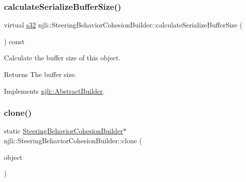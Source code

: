 \mbox{\label{classnjli_1_1_steering_behavior_cohesion_builder_ac9e90802685baa1d00dc45f5923e06e8}} 
\subsubsection{\texorpdfstring{calculate\+Serialize\+Buffer\+Size()}{calculateSerializeBufferSize()}}
{\footnotesize\ttfamily virtual \mbox{\hyperlink{_util_8h_aa62c75d314a0d1f37f79c4b73b2292e2}{s32}} njli\+::\+Steering\+Behavior\+Cohesion\+Builder\+::calculate\+Serialize\+Buffer\+Size (\begin{DoxyParamCaption}{ }\end{DoxyParamCaption}) const\hspace{0.3cm}{\ttfamily [virtual]}}

Calculate the buffer size of this object.

\begin{DoxyReturn}{Returns}
The buffer size. 
\end{DoxyReturn}


Implements \mbox{\hyperlink{classnjli_1_1_abstract_builder_aa1d220053e182c37b31b427499c6eacf}{njli\+::\+Abstract\+Builder}}.

\mbox{\label{classnjli_1_1_steering_behavior_cohesion_builder_ac8a51456192f7cbc581e5ffec74336d6}} 
\subsubsection{\texorpdfstring{clone()}{clone()}}
{\footnotesize\ttfamily static \mbox{\hyperlink{classnjli_1_1_steering_behavior_cohesion_builder}{Steering\+Behavior\+Cohesion\+Builder}}$\ast$ njli\+::\+Steering\+Behavior\+Cohesion\+Builder\+::clone (\begin{DoxyParamCaption}\item[{const \mbox{\hyperlink{classnjli_1_1_steering_behavior_cohesion_builder}{Steering\+Behavior\+Cohesion\+Builder}} \&}]{object }\end{DoxyParamCaption})\hspace{0.3cm}{\ttfamily [static]}}

